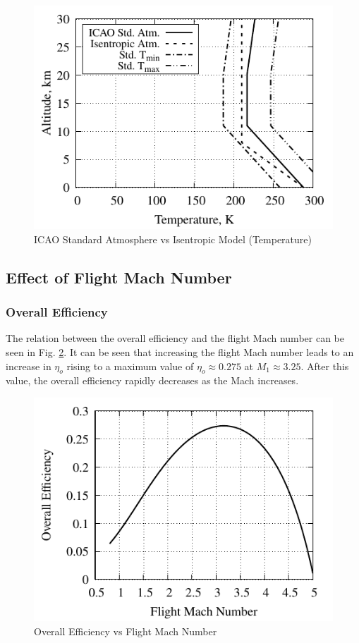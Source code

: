 \documentclass[conf]{new-aiaa} %
\begin{document}
\begin{figure}[H] %
    \centering
    \includegraphics[]{media/atmosphere_validation_files/ICAO_vs_ISEN_temperature.pdf}
    \caption{\label{fig:partbtemp}ICAO Standard Atmosphere vs Isentropic Model (Temperature)}
\end{figure}

\subsection{Effect of Flight Mach Number} %
\subsubsection{Overall Efficiency}
The relation between the overall efficiency and the flight Mach number can be seen in Fig. \ref{fig:partcetao}. It can be seen that increasing the flight Mach number leads to an increase in $\eta_o$ rising to a maximum value of $\eta_o\approx0.275$ at $M_1\approx3.25$. After this value, the overall efficiency rapidly decreases as the Mach increases.

\begin{figure}[H] %
    \centering
    \includegraphics[]{media/performance_parameter_files/part_c_eta_o.pdf}
    \caption{\label{fig:partcetao}Overall Efficiency vs Flight Mach Number}
\end{figure}
\end{document}
